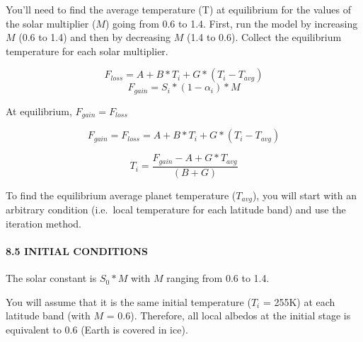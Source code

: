 \documentclass[
  letterpaper,
  DIV=11,
  numbers=noendperiod]{scrartcl}
\let\oldparagraph\paragraph
\renewcommand{\paragraph}[1]{\oldparagraph{#1}\mbox{}}
\begin{document}
You'll need to find the average temperature (T) at equilibrium for the
values of the solar multiplier (\(M\)) going from 0.6 to 1.4. First, run
the model by increasing \(M\) (0.6 to 1.4) and then by decreasing \(M\)
(1.4 to 0.6). Collect the equilibrium temperature for each solar
multiplier.

\[F_{loss} = A + B * T_i + G * (T_i - T_{avg})\]
\[F_{gain} = S_i * (1-\alpha_i) * M\]

At equilibrium, \(F_{gain} = F_{loss}\)

\[F_{gain} = F_{loss} = A + B * T_i + G * (T_i - T_{avg})\]

\begin{equation}
\tag{12}
T_i = \frac{F_{gain} - A + G * T_{avg}}{(B+G)}
\end{equation}

To find the equilibrium average planet temperature (\(T_{avg}\)), you
will start with an arbitrary condition (i.e.~local temperature for each
latitude band) and use the iteration method.

\hypertarget{initial-conditions}{%
\paragraph{8.5 INITIAL CONDITIONS}\label{initial-conditions}}

The solar constant is \(S_0 * M\) with \(M\) ranging from 0.6 to 1.4.

You will assume that it is the same initial temperature (\(T_i\) = 255K)
at each latitude band (with \(M\) = 0.6). Therefore, all local albedos
at the initial stage is equivalent to 0.6 (Earth is covered in ice).
\end{document}

